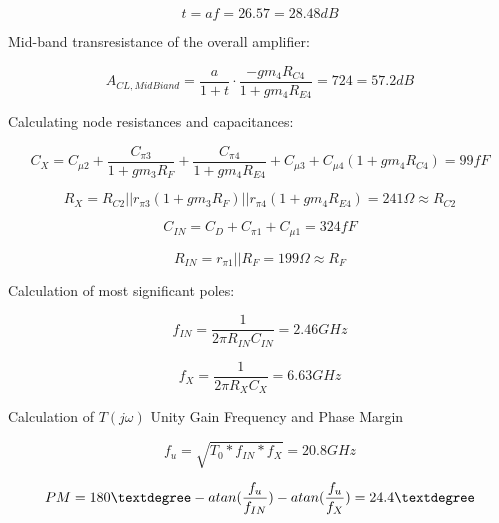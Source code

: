 \documentclass[12pt,a4paper]{article}
\begin{document}
\begin{equation}
  t = a f = 26.57 = 28.48dB
\end{equation}

Mid-band transresistance of the overall amplifier:

\begin{equation}
  A_{CL, MidBiand} = \frac{a}{1 + t} \cdot \frac{-gm_4 R_{C4}}{1 + gm_4 R_{E4}} = 724 = 57.2dB
\end{equation}

Calculating node resistances and capacitances:

\begin{equation}
  C_X = C_{\mu 2} + \frac{C_{\pi 3}}{1 + gm_3 R_F} + \frac{C_{\pi 4}}{1+gm_4 R_{E4}} + C_{\mu 3} + C_{\mu 4} (1 + gm_4 R_{C4}) = 99fF
\end{equation}

\begin{equation}
  R_X = R_{C2} || r_{\pi 3}(1+gm_3 R_F) || r_{\pi4}(1+gm_4 R_{E4}) = 241\Omega \approx R_{C2}
\end{equation}

\begin{equation}
  C_{IN} = C_D + C_{\pi1} + C_{\mu1} = 324fF
\end{equation}

\begin{equation}
  R_{IN} = r_{\pi1} || R_F = 199\Omega \approx R_F
\end{equation}

Calculation of most significant poles:

\begin{equation}
  f_{IN} = \frac{1}{2 \pi R_{IN} C_{IN}} = 2.46GHz
\end{equation}

\begin{equation}
  f_{X} = \frac{1}{2 \pi R_{X} C_{X}} = 6.63GHz
\end{equation}

Calculation of $T(j\omega)$ Unity Gain Frequency and Phase Margin

\begin{equation}
  f_{u} = \sqrt{T_0 * f_{IN} * f_{X}} = 20.8GHz
\end{equation}

\begin{equation}
  PM = 180\textdegree  - atan(\frac{f_u}{f_{IN}}) - atan(\frac{f_u}{f_{X}}) = 24.4\textdegree
\end{equation}
\end{document}

